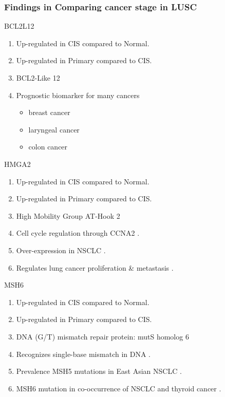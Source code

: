 \documentclass{beamer}
\begin{document}
    \begin{frame}[allowframebreaks]
        \frametitle{Findings in Comparing cancer stage in LUSC}

        \begin{block}{BCL2L12}
            \begin{enumerate}
                \item Up-regulated in CIS compared to Normal.
                \item Up-regulated in Primary compared to CIS.
                \item BCL2-Like 12
                \item Prognostic biomarker for many cancers
                \begin{itemize}
                    \item breast cancer \cite{BCL2L12-1, BCL2L12-4}
                    \item laryngeal cancer \cite{BCL2L12-2}
                    \item colon cancer \cite{BCL2L12-3}
                \end{itemize}
            \end{enumerate}
        \end{block}

        \begin{block}{HMGA2}
            \begin{enumerate}
                \item Up-regulated in CIS compared to Normal.
                \item Up-regulated in Primary compared to CIS.
                \item High Mobility Group AT-Hook 2
                \item Cell cycle regulation through CCNA2 \cite{HMGA2-1, HMGA2-4}.
                \item Over-expression in NSCLC \cite{HMGA2-2}.
                \item Regulates lung cancer proliferation \& metastasis \cite{HMGA2-3}.
            \end{enumerate}
        \end{block}

        \begin{block}{MSH6}
            \begin{enumerate}
                \item Up-regulated in CIS compared to Normal.
                \item Up-regulated in Primary compared to CIS.
                \item DNA (G/T) mismatch repair protein: mutS homolog 6
                \item Recognizes single-base mismatch in DNA \cite{MSH6-1}.
                \item Prevalence MSH5 mutations in East Asian NSCLC \cite{MSH6-2}.
                \item MSH6 mutation in co-occurrence of NSCLC and thyroid cancer \cite{MSH6-3}.
            \end{enumerate}
        \end{block}


\end{frame}
\end{document}
